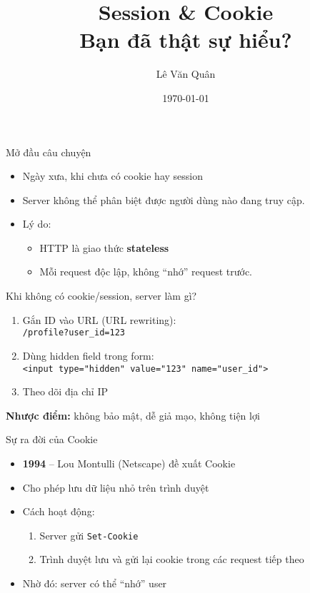 \documentclass[aspectratio=169]{beamer}
\title{Session \& Cookie\\Bạn đã thật sự hiểu?}
\author{Lê Văn Quân}
\date{\today}
\begin{document}
\begin{frame}
  \titlepage
\end{frame}

\begin{frame}{Mở đầu câu chuyện}
  \begin{itemize}
    \item Ngày xưa, khi chưa có cookie hay session
    \item Server không thể phân biệt được người dùng nào đang truy cập.
    \item Lý do:
    \begin{itemize}
        \item HTTP là giao thức \textbf{stateless}
        \item Mỗi request độc lập, không ``nhớ'' request trước.
    \end{itemize}
  \end{itemize}
\end{frame}

\begin{frame}{Khi không có cookie/session, server làm gì?}
  \begin{enumerate}
    \item Gắn ID vào URL (URL rewriting):\\
    \texttt{/profile?user\_id=123}
    \item Dùng hidden field trong form:\\
    \texttt{<input type="hidden" value="123" name="user\_id">}
    \item Theo dõi địa chỉ IP
  \end{enumerate}
  \vspace{1em}
  \textbf{Nhược điểm:} không bảo mật, dễ giả mạo, không tiện lợi
\end{frame}

\begin{frame}{Sự ra đời của Cookie}
  \begin{itemize}
    \item \textbf{1994} – Lou Montulli (Netscape) đề xuất Cookie
    \item Cho phép lưu dữ liệu nhỏ trên trình duyệt
    \item Cách hoạt động:
    \begin{enumerate}
      \item Server gửi \texttt{Set-Cookie}
      \item Trình duyệt lưu và gửi lại cookie trong các request tiếp theo
    \end{enumerate}
    \item Nhờ đó: server có thể ``nhớ'' user
  \end{itemize}
\end{frame}
\end{document}
